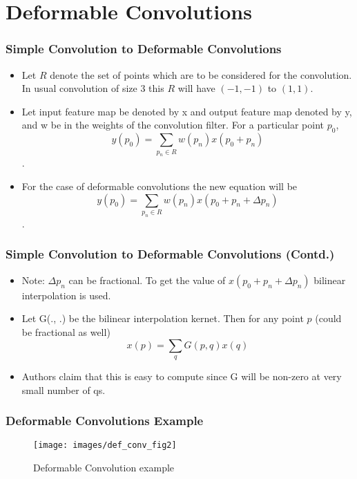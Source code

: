 \documentclass{beamer}
\begin{document}
\section{Deformable Convolutions} %
\begin{frame}
  \frametitle{Simple Convolution to Deformable Convolutions}
  \begin{itemize}
  \item Let $R$ denote the set of points which are to be considered for the convolution. In usual convolution of size 3 this $R$ will have $(-1,-1)$ to $(1, 1)$.
  \item Let input feature map be denoted by x and output feature map denoted by y, and w be in the weights of the convolution filter. For a particular point $p_0$, $$y(p_0) = \sum_{p_n \in R}w(p_n) x(p_0 + p_n)$$.
  \item For the case of deformable convolutions the new equation will be
    $$y(p_0) = \sum_{p_n \in R}w(p_n) x(p_0 + p_n + \Delta p_n)$$.
  \end{itemize}
\end{frame}

\begin{frame}
  \frametitle{Simple Convolution to Deformable Convolutions (Contd.)}
  \begin{itemize}
  \item Note: $\Delta p_n$ can be fractional. To get the value of $x(p_0 + p_n + \Delta p_n)$ bilinear interpolation is used.
  \item Let G(., .) be the bilinear interpolation kernet. Then for any point $p$ (could be fractional as well) $$x(p) = \sum_{q}G(p,q) x(q)$$
  \item Authors claim that this is easy to compute since G will be non-zero at very small number of qs.
  \end{itemize}
\end{frame}

\begin{frame}
  \frametitle{Deformable Convolutions Example}
  \begin{figure}[H]
    \centering
    \texttt{[image: images/def\_conv\_fig2]}
    \caption{Deformable Convolution example}
    \label{fig:dfc1}
  \end{figure}
\end{frame}
\end{document}
